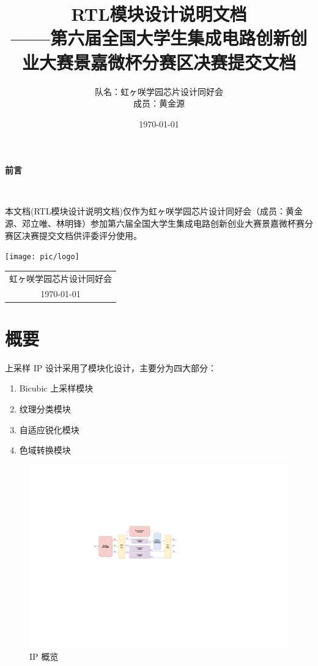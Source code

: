 \documentclass[12pt, a4paper, oneside]{ctexbook}
\title{{\Huge{\textbf{RTL模块设计说明文档}}}\normalsize{\\——第六届全国大学生集成电路创新创业大赛景嘉微杯分赛区决赛提交文档}}
\author{队名：虹ヶ咲学园芯片设计同好会\\ 成员：黄金源\space邓立唯\space林明锋}
\date{\today}
\begin{document}
	
	\maketitle	
	\setcounter{page}{1}
	\begin{center}
		\Huge\textbf{前言}
	\end{center}~\
	
	本文档(RTL模块设计说明文档)仅作为虹ヶ咲学园芯片设计同好会（成员：黄金源、邓立唯、林明锋）参加第六届全国大学生集成电路创新创业大赛景嘉微杯赛分赛区决赛提交文档供评委评分使用。
	~\\
	\begin{flushright}
		\texttt{[image: pic/logo]}\\
		\begin{tabular}{c}
			虹ヶ咲学园芯片设计同好会\\
			\today
		\end{tabular}
	\end{flushright}
	\newpage
	\setcounter{page}{1}
	\tableofcontents
	\newpage
	\setcounter{page}{1}
	
	\chapter{概要}
	上采样 IP 设计采用了模块化设计，主要分为四大部分：
	\begin{enumerate}
		\item Bicubic 上采样模块
		\item 纹理分类模块
		\item 自适应锐化模块
		\item 色域转换模块
	\end{enumerate}
	
	\begin{figure}[h]
		\centering
		\includegraphics[scale=0.4]{pic/all.drawio.pdf}
		\caption{IP 概览}
		\label{fig:ip-overview}
	\end{figure}
	
\end{document}
